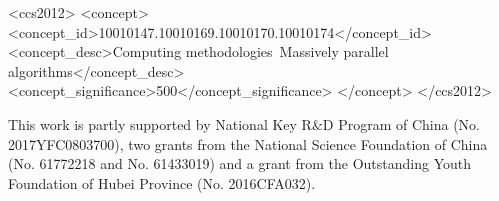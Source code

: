 \documentclass[sigconf,review,anonymous]{acmart}
\begin{document}
\begin{CCSXML}
<ccs2012>
 <concept>
	<concept_id>10010147.10010169.10010170.10010174</concept_id>
	<concept_desc>Computing methodologies~Massively parallel algorithms</concept_desc>
	<concept_significance>500</concept_significance>
 </concept>
</ccs2012>
\end{CCSXML}



\maketitle









\begin{acks}
This work is partly supported by National Key R\&D Program of China (No. 2017YFC0803700), two grants 
from the National Science Foundation of China (No. 61772218 and No. 61433019) and a grant 
from the Outstanding Youth Foundation of Hubei Province (No. 2016CFA032).
\end{acks}




\end{document}

